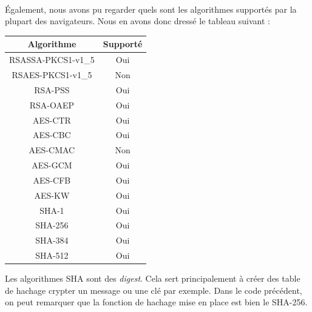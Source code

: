 \documentclass[a4paper,12pt]{report}
\begin{document}
	\paragraph*{}
	Également, nous avons pu regarder quels sont les algorithmes supportés par la plupart des navigateurs. Nous en avons donc dressé le tableau suivant : 
	\begin{center}
	\begin{tabular}[h]{|*{2}{c|}}
  		\hline
  		Algorithme & Supporté\\
  		\hline
  		RSASSA-PKCS1-v1\_5 & Oui\\
  		\hline
  		RSAES-PKCS1-v1\_5 & Non\\
  		\hline
  		RSA-PSS & Oui\\
  		\hline
  		RSA-OAEP & Oui\\
  		\hline
  		AES-CTR & Oui\\
  		\hline
  		AES-CBC & Oui\\
  		\hline
  		AES-CMAC & Non\\
  		\hline
  		AES-GCM & Oui\\
  		\hline
  		AES-CFB & Oui\\
  		\hline
  		AES-KW & Oui\\
  		\hline
  		SHA-1 & Oui\\
  		\hline
  		SHA-256 & Oui\\
  		\hline
  		SHA-384 & Oui\\
  		\hline
  		SHA-512 & Oui\\
  		\hline
	\end{tabular}
	\end{center}
	Les algorithmes SHA sont des \textit{digest}. Cela sert principalement à créer des table de hachage crypter un message ou une clé par exemple. Dans le code précédent, on peut remarquer que la fonction de hachage mise en place est bien le SHA-256.
\end{document}
